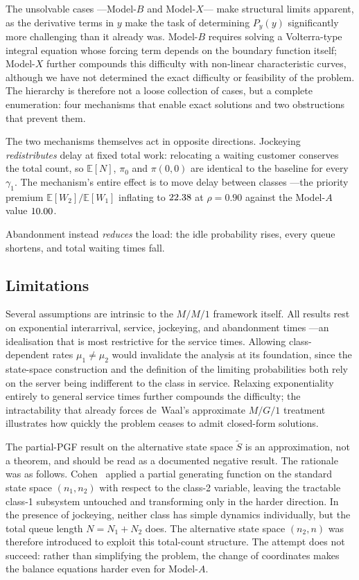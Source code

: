 The unsolvable cases ---Model-$B$ and Model-$X$--- make structural limits apparent, as the derivative terms in $y$ make the task of determining $P_y(y)$ significantly more challenging than it already was. Model-$B$ requires solving a Volterra-type integral equation whose forcing term depends on the boundary function itself; Model-$X$ further compounds this difficulty with non-linear characteristic curves, although we have not determined the exact difficulty or feasibility of the problem. The hierarchy is therefore not a loose collection of cases, but a complete enumeration: four mechanisms that enable exact solutions and two obstructions that prevent them.

The two mechanisms themselves act in opposite directions. Jockeying \emph{redistributes} delay at fixed total work: relocating a waiting customer conserves the total count, so $\mathbb{E}[N]$, $\pi_0$ and $\pi(0,0)$ are identical to the baseline for every $\gamma_1$. The mechanism's entire effect is to move delay between classes ---the priority premium $\mathbb{E}[W_2]/\mathbb{E}[W_1]$ inflating to $22.38$ at $\rho=0.90$ against the Model-$A$ value $10.00$.

Abandonment instead \emph{reduces} the load: the idle probability rises, every queue shortens, and total waiting times fall.

\subsection{Limitations}

Several assumptions are intrinsic to the $M/M/1$ framework itself. All results rest on exponential interarrival, service, jockeying, and abandonment times ---an idealisation that is most restrictive for the service times. Allowing class-dependent rates $\mu_1 \neq \mu_2$ would invalidate the analysis at its foundation, since the state-space construction and the definition of the limiting probabilities both rely on the server being indifferent to the class in service. Relaxing exponentiality entirely to general service times further compounds the difficulty; the intractability that already forces de~Waal's approximate $M/G/1$ treatment illustrates how quickly the problem ceases to admit closed-form solutions.

The partial-PGF result on the alternative state space $\widetilde{S}$ is an approximation, not a theorem, and should be read as a documented negative result. The rationale was as follows. Cohen~\cite{cohen1956delay} applied a partial generating function on the standard state space $(n_1,n_2)$ with respect to the class-2 variable, leaving the tractable class-1 subsystem untouched and transforming only in the harder direction. In the presence of jockeying, neither class has simple dynamics individually, but the total queue length $N = N_1 + N_2$ does. The alternative state space $(n_2, n)$ was therefore introduced to exploit this total-count structure. The attempt does not succeed: rather than simplifying the problem, the change of coordinates makes the balance equations harder even for Model-$A$.

